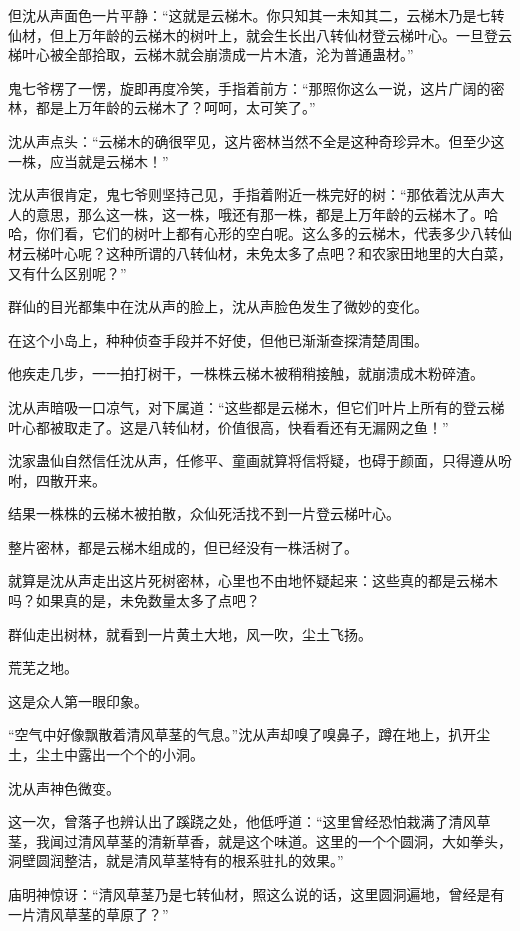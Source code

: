 \begin{this_body}
但沈从声面色一片平静：“这就是云梯木。你只知其一未知其二，云梯木乃是七转仙材，但上万年龄的云梯木的树叶上，就会生长出八转仙材登云梯叶心。一旦登云梯叶心被全部拾取，云梯木就会崩溃成一片木渣，沦为普通蛊材。”

鬼七爷楞了一愣，旋即再度冷笑，手指着前方：“那照你这么一说，这片广阔的密林，都是上万年龄的云梯木了？呵呵，太可笑了。”

沈从声点头：“云梯木的确很罕见，这片密林当然不全是这种奇珍异木。但至少这一株，应当就是云梯木！”

沈从声很肯定，鬼七爷则坚持己见，手指着附近一株完好的树：“那依着沈从声大人的意思，那么这一株，这一株，哦还有那一株，都是上万年龄的云梯木了。哈哈，你们看，它们的树叶上都有心形的空白呢。这么多的云梯木，代表多少八转仙材云梯叶心呢？这种所谓的八转仙材，未免太多了点吧？和农家田地里的大白菜，又有什么区别呢？”

群仙的目光都集中在沈从声的脸上，沈从声脸色发生了微妙的变化。

在这个小岛上，种种侦查手段并不好使，但他已渐渐查探清楚周围。

他疾走几步，一一拍打树干，一株株云梯木被稍稍接触，就崩溃成木粉碎渣。

沈从声暗吸一口凉气，对下属道：“这些都是云梯木，但它们叶片上所有的登云梯叶心都被取走了。这是八转仙材，价值很高，快看看还有无漏网之鱼！”

沈家蛊仙自然信任沈从声，任修平、童画就算将信将疑，也碍于颜面，只得遵从吩咐，四散开来。

结果一株株的云梯木被拍散，众仙死活找不到一片登云梯叶心。

整片密林，都是云梯木组成的，但已经没有一株活树了。

就算是沈从声走出这片死树密林，心里也不由地怀疑起来：这些真的都是云梯木吗？如果真的是，未免数量太多了点吧？

群仙走出树林，就看到一片黄土大地，风一吹，尘土飞扬。

荒芜之地。

这是众人第一眼印象。

“空气中好像飘散着清风草茎的气息。”沈从声却嗅了嗅鼻子，蹲在地上，扒开尘土，尘土中露出一个个的小洞。

沈从声神色微变。

这一次，曾落子也辨认出了蹊跷之处，他低呼道：“这里曾经恐怕栽满了清风草茎，我闻过清风草茎的清新草香，就是这个味道。这里的一个个圆洞，大如拳头，洞壁圆润整洁，就是清风草茎特有的根系驻扎的效果。”

庙明神惊讶：“清风草茎乃是七转仙材，照这么说的话，这里圆洞遍地，曾经是有一片清风草茎的草原了？”


\end{this_body}
